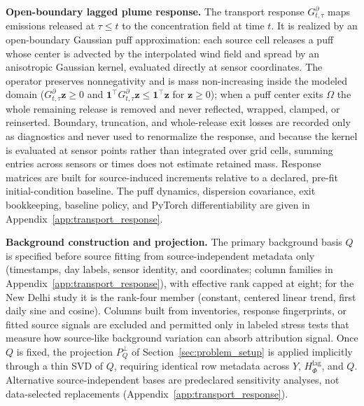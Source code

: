 \noindent\textbf{Open-boundary lagged plume response.}\label{subsec:plume_response}
The transport response \(G_{t,\tau}^{\partial}\) maps emissions released at
\(\tau\le t\) to the concentration field at time \(t\).  It is realized by an
open-boundary Gaussian puff approximation: each source cell releases a puff whose
center is advected by the interpolated wind field and spread by an anisotropic
Gaussian kernel, evaluated directly at sensor coordinates.  The operator
preserves nonnegativity and is mass non-increasing inside the modeled domain
(\(G_{t,\tau}^{\partial}\mathbf z\ge0\) and
\(\mathbf 1^\top G_{t,\tau}^{\partial}\mathbf z\le\mathbf 1^\top\mathbf z\) for
\(\mathbf z\ge0\)); when a puff center exits \(\Omega\) the whole remaining
release is removed and never reflected, wrapped, clamped, or reinserted.
Boundary, truncation, and whole-release exit losses are recorded only as
diagnostics and never used to renormalize the response, and because the kernel is
evaluated at sensor points rather than integrated over grid cells, summing
entries across sensors or times does not estimate retained mass.  Response
matrices are built for source-induced increments relative to a declared, pre-fit
initial-condition baseline.  The puff dynamics, dispersion covariance, exit
bookkeeping, baseline policy, and PyTorch differentiability are given in
Appendix~\ref{app:transport_response}.

\noindent\textbf{Background construction and projection.}\label{subsec:background_construction}
The primary background basis \(Q\) is specified before source fitting from
source-independent metadata only (timestamps, day labels, sensor identity, and
coordinates; column families in Appendix~\ref{app:transport_response}), with
effective rank capped at eight; for the New Delhi study it is the rank-four
member (constant, centered linear trend, first daily sine and cosine).  Columns
built from inventories, response fingerprints, or fitted source signals are
excluded and permitted only in labeled stress tests that measure how source-like
background variation can absorb attribution signal.  Once \(Q\) is fixed, the
projection \(P_Q^\perp\) of Section~\ref{sec:problem_setup} is applied implicitly
through a thin SVD of \(Q\), requiring identical row metadata across \(Y\),
\(H_\Phi^{\mathrm{lag}}\), and \(Q\).  Alternative source-independent bases are
predeclared sensitivity analyses, not data-selected replacements
(Appendix~\ref{app:transport_response}).

